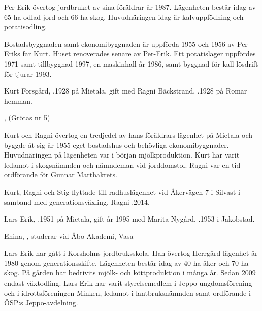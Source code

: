 Per-Erik övertog jordbruket av sina föräldrar år 1987. Lägenheten består idag av 65 ha odlad jord och 66 ha skog. Huvudnäringen idag är kalvuppfödning och potatisodling.

Bostadsbyggnaden samt ekonomibyggnaden är uppförda 1955 och 1956 av Per-Eriks far Kurt. Huset renoverades senare av Per-Erik. Ett potatislager uppfördes 1971 samt tillbyggnad 1997, en maskinhall år 1986, samt byggnad för kall lösdrift för tjurar 1993.


Kurt Forsgård, .1928 på Mietala, gift med Ragni Bäckstrand, .1928 på Romar hemman.
\begin{jhchildren}
  \item {}, (Grötas nr 5)
  \item {}
\end{jhchildren}

Kurt och Ragni övertog en tredjedel av hans föräldrars lägenhet på Mietala och byggde åt sig år 1955 eget bostadshus och behövliga ekonomibyggnader. Huvudnäringen på lägenheten var i början mjölkproduktion. Kurt har varit ledamot i skogsnämnden och nämndeman vid jorddomstol. Ragni var en tid ordförande för Gunnar Marthakrets.

Kurt, Ragni och Stig flyttade till radhuslägenhet vid Åkervägen 7 i Silvast i samband med generationsväxling. Ragni .2014.






Lars-Erik, .1951 på Mietala, gift år 1995 med Marita Nygård, .1953 i Jakobstad.
\begin{jhchildren}
  \item Enina, , studerar vid Åbo Akademi, Vasa
\end{jhchildren}

Lars-Erik har gått i Korsholms jordbruksskola. Han övertog Herrgård	lägenhet år 1980 genom generationsskifte. Lägenheten består idag av 40 ha åker och 70 ha skog. På gården har bedrivits mjölk- och köttproduktion i många år. Sedan 2009 endast växtodling. Lars-Erik har varit styrelsemedlem i Jeppo ungdomsförening och i idrottsföreningen Minken, ledamot i lantbruksnämnden samt ordförande i ÖSP:s Jeppo-avdelning.


